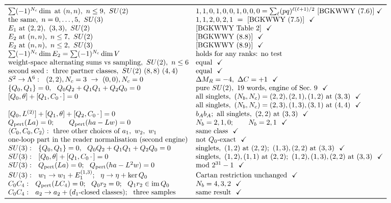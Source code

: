 \documentclass[10pt]{article}
\newcommand{\ok}{\checkmark}
\begin{document}
{\small\[
\begin{array}{ll}
\toprule
\sum(-1)^{N_c}\dim\ \text{at}\ (n,n),\ n\le9,\ SU(2) & 1,1,0,1,0,0,1,0,0,0=\sum_\ell(pq)^{\ell(\ell+1)/2}\ \text{[BGKWWY (7.6)]}\ \ok\\
\text{the same},\ n=0,\dots,5,\ SU(3) & 1,1,2,0,2,1\ =\ \text{[BGKWWY (7.5)]}\ \ \ok\\
E_1\ \text{at}\ (2,2),\ (3,3),\ SU(2) & \text{[BGKWWY Table 2]}\ \ \ok\\
E_2\ \text{at}\ (n,n),\ n\le7,\ SU(2) & \text{[BGKWWY (8.8)]}\ \ \ok\\
E_2\ \text{at}\ (n,n),\ n\le2,\ SU(3) & \text{[BGKWWY (8.9)]}\ \ \ok\\
\sum(-1)^{N_c}\dim E_2=\sum(-1)^{N_c}\dim V & \text{holds for any ranks: no test}\\
\text{weight-space alternating sums vs sampling},\ SU(2),\ n\le6 & \text{equal}\ \ \ok\\
\text{second seed}:\ \text{three partner classes},\ SU(2)\ (8,8)\ (4,4) & \text{equal}\ \ \ok\\
S^2\to\Lambda^6:\ \ (2,2),N_c=3\ \to\ (0,0),N_c=0 & \Delta M_R=-4,\ \Delta C=+1\ \ \ok\\
\{Q_0,Q_1\}=0,\ \ Q_0Q_2+Q_1Q_1+Q_2Q_0=0 & \text{pure }SU(2),\ 19\text{ words, engine of Sec.\ 9}\ \ \ok\\
{}[Q_0,\theta]+[Q_1,C_0\,\cdot\,]=0 & \text{all singlets},\ (N_b,N_c)=(2,2),(2,1),(1,2)\text{ at }(3,3)\ \ \ok\\
 & \text{all singlets},\ (N_b,N_c)=(2,3),(1,3),(3,1)\text{ at }(4,4)\ \ \ok\\
{}[Q_0,L^{(2)}]+[Q_1,\theta]+[Q_2,C_0\,\cdot\,]=0 & b_Ab_A;\ \text{all singlets},\ (2,2)\text{ at }(3,3)\ \ \ok\\
Q_{\rm pert}(La)=0;\qquad Q_{\rm pert}(ha-Lw)=0 & N_b=2,1,0;\qquad N_b=2,1\ \ \ok\\
\langle C_0,C_0,C_2\rangle:\ \text{three other choices of }a_1,\ w_2,\ w_1 & \text{same class}\ \ \ok\\
\text{one-loop part in the reader normalisation (second engine)} & \text{not }Q_0\text{-exact}\ \ \ok\\
SU(3):\ \ \{Q_0,Q_1\}=0,\ \ Q_0Q_2+Q_1Q_1+Q_2Q_0=0 & \text{singlets},\ (1,2)\text{ at }(2,2);\ (1,3),(2,2)\text{ at }(3,3)\ \ \ok\\
SU(3):\ \ [Q_0,\theta]+[Q_1,C_0\,\cdot\,]=0 & \text{singlets},\ (1,2),(1,1)\text{ at }(2,2);\ (1,2),(1,3),(2,2)\text{ at }(3,3)\ \ \ok\\
SU(3):\ \ Q_{\rm pert}(La)=0;\ \ Q_{\rm pert}(ha-L^2w)=0 & \text{mod }2^{31}-1\ \ \ok\\
SU(3):\ \ w_1\to w_1+E_1^{(1,3)};\ \ \eta\to\eta+\ker Q_0 & \text{Cartan restriction unchanged}\ \ \ok\\
C_0C_4:\ \ Q_{\rm pert}(LC_4)=0;\ \ Q_0r_2=0;\ \ Q_1r_2\in\operatorname{im}Q_0 & N_b=4,3,2\ \ \ok\\
C_0C_4:\ \ a_2\to a_2+(d_1\text{-closed classes});\ \ \text{three samples} & \text{same result}\ \ \ok\\\bottomrule
\end{array}
\]}
\end{document}
